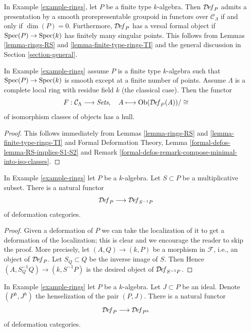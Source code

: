 \noindent
In Example \ref{example-rings}, let $P$ be a finite type
$k$-algebra. Then $\mathcal{D}\!\mathit{ef}_P$
admits a presentation by a smooth prorepresentable groupoid in functors
over $\mathcal{C}_\Lambda$ if and only if $\dim(P) = 0$.
Furthermore, $\mathcal{D}\!\mathit{ef}_P$ has a versal formal
object if $\mathop{\mathrm{Spec}}(P) \to \mathop{\mathrm{Spec}}(k)$ has finitely many
singular points. This follows from Lemmas \ref{lemma-rings-RS} and
\ref{lemma-finite-type-rings-TI}
and the general discussion in Section \ref{section-general}.

\begin{lemma}
\label{lemma-rings-hull}
In Example \ref{example-rings} assume $P$ is a finite type
$k$-algebra such that $\mathop{\mathrm{Spec}}(P) \to \mathop{\mathrm{Spec}}(k)$ is smooth except
at a finite number of points.
Assume $\Lambda$ is a complete local ring with residue field $k$
(the classical case). Then the functor
$$
F : \mathcal{C}_\Lambda \longrightarrow \textit{Sets},\quad
A \longmapsto \mathop{\mathrm{Ob}}\nolimits(\mathcal{D}\!\mathit{ef}_P(A))/\cong
$$
of isomorphism classes of objects has a hull.
\end{lemma}

\begin{proof}
This follows immediately from Lemmas \ref{lemma-rings-RS} and
\ref{lemma-finite-type-rings-TI} and
Formal Deformation Theory, Lemma \ref{formal-defos-lemma-RS-implies-S1-S2}
and Remark \ref{formal-defos-remark-compose-minimal-into-iso-classes}.
\end{proof}

\begin{lemma}
\label{lemma-localization}
In Example \ref{example-rings} let $P$ be a $k$-algebra.
Let $S \subset P$ be a multiplicative subset. There is a natural functor
$$
\mathcal{D}\!\mathit{ef}_P \longrightarrow \mathcal{D}\!\mathit{ef}_{S^{-1}P}
$$
of deformation categories.
\end{lemma}

\begin{proof}
Given a deformation of $P$ we can take the localization
of it to get a deformation of the localization; this is
clear and we encourage the reader to skip the proof. More precisely,
let $(A, Q) \to (k, P)$ be a morphism in $\mathcal{F}$, i.e.,
an object of $\mathcal{D}\!\mathit{ef}_P$. Let $S_Q \subset Q$ be the
inverse image of $S$. Then
Hence $(A, S_Q^{-1}Q) \to (k, S^{-1}P)$
is the desired object of $\mathcal{D}\!\mathit{ef}_{S^{-1}P}$.
\end{proof}

\begin{lemma}
\label{lemma-henselization}
In Example \ref{example-rings} let $P$ be a $k$-algebra.
Let $J \subset P$ be an ideal.
Denote $(P^h, J^h)$ the henselization of the pair $(P, J)$.
There is a natural functor
$$
\mathcal{D}\!\mathit{ef}_P \longrightarrow \mathcal{D}\!\mathit{ef}_{P^h}
$$
of deformation categories.
\end{lemma}

